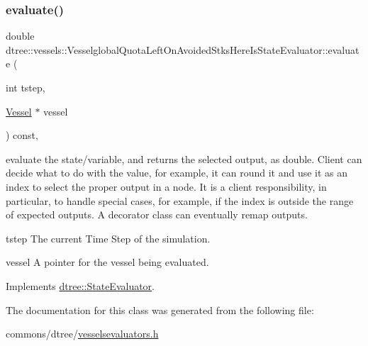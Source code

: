\subsubsection{\texorpdfstring{evaluate()}{evaluate()}}
{\footnotesize\ttfamily double dtree\+::vessels\+::\+Vesselglobal\+Quota\+Left\+On\+Avoided\+Stks\+Here\+Is\+State\+Evaluator\+::evaluate (\begin{DoxyParamCaption}\item[{int}]{tstep,  }\item[{\mbox{\hyperlink{class_vessel}{Vessel}} $\ast$}]{vessel }\end{DoxyParamCaption}) const\hspace{0.3cm}{\ttfamily [inline]}, {\ttfamily [virtual]}}



evaluate the state/variable, and returns the selected output, as double. Client can decide what to do with the value, for example, it can round it and use it as an index to select the proper output in a node. It is a client responsibility, in particular, to handle special cases, for example, if the index is outside the range of expected outputs. A decorator class can eventually remap outputs. 

\begin{DoxyItemize}
\item tstep The current Time Step of the simulation. \item vessel A pointer for the vessel being evaluated. \end{DoxyItemize}


Implements \mbox{\hyperlink{classdtree_1_1_state_evaluator_ab57666219fbdc728f40d9d5acd5726cb}{dtree\+::\+State\+Evaluator}}.



The documentation for this class was generated from the following file\+:\begin{DoxyCompactItemize}
\item 
commons/dtree/\mbox{\hyperlink{vesselsevaluators_8h}{vesselsevaluators.\+h}}\end{DoxyCompactItemize}
